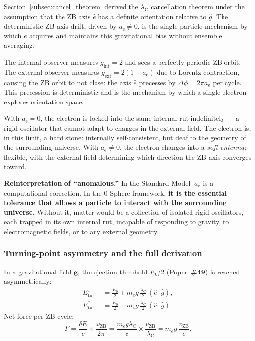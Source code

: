 \documentclass[12pt,letterpaper]{article}
\newcommand{\paperno}[1]{\textbf{\#{}#1}}
\newcommand{\vZB}{v_{\mathrm{ZB}}}
\newcommand{\lambdaC}{\lambda_{\mathrm{C}}}
\newcommand{\anom}{a_{\mathrm{e}}}
\newcommand{\omZB}{\omega_{\text{ZB}}}
\begin{document}
Section~\ref{subsec:cancel_theorem} derived the $\lambdaC$ cancellation theorem under the assumption that the ZB axis $\hat{e}$ has a definite orientation relative to $\hat{g}$. The deterministic ZB axis drift, driven by $\anom \neq 0$, is the single-particle mechanism by which $\hat{e}$ acquires and maintains this gravitational bias without ensemble averaging.

The internal observer measures $g_{\mathrm{int}}=2$ and sees a perfectly periodic ZB orbit. The external observer measures $g_{\mathrm{ext}}=2(1+\anom)$ due to Lorentz contraction, causing the ZB orbit to not close: the axis $\hat{e}$ precesses by $\Delta\phi = 2\pi\anom$ per cycle. This precession is deterministic and is the mechanism by which a single electron explores orientation space.

With $\anom = 0$, the electron is locked into the same internal rut indefinitely --- a rigid oscillator that cannot adapt to changes in the external field. The electron is, in this limit, a hard stone: internally self-consistent, but deaf to the geometry of the surrounding universe. With $\anom \neq 0$, the electron changes into a \emph{soft antenna}: flexible, with the external field determining which direction the ZB axis converges toward.

\begin{mdframed}[style=orangebox]
\textbf{Reinterpretation of ``anomalous.''} In the Standard Model, $\anom$ is a computational correction. In the 0-Sphere framework, \textbf{it is the essential tolerance that allows a particle to interact with the surrounding universe.} Without it, matter would be a collection of isolated rigid oscillators, each trapped in its own internal rut, incapable of responding to gravity, to electromagnetic fields, or to any external geometry.
\end{mdframed}

\subsubsection{Turning-point asymmetry and the full derivation}
\label{subsec:single_atom}

In a gravitational field $\mathbf{g}$, the ejection threshold $E_0/2$ (Paper~\paperno{49}) is reached asymmetrically:
\begin{align}
E_{\mathrm{turn}}^\downarrow &= \frac{E_0}{2} + m_e g\,\frac{\lambdaC}{2}\,(\hat{e}\cdot\hat{g}), \\
E_{\mathrm{turn}}^\uparrow &= \frac{E_0}{2} - m_e g\,\frac{\lambdaC}{2}\,(\hat{e}\cdot\hat{g}).
\end{align}
Net force per ZB cycle:
\begin{equation}
F = \frac{\delta E}{c}\times\frac{\omZB}{2\pi}
= \frac{m_e g\lambdaC}{c}\times\frac{\vZB}{\lambdaC}
= m_e g\,\frac{\vZB}{c}.
\end{equation}
\end{document}
